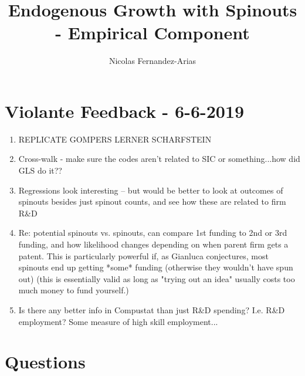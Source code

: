 \documentclass[12pt,english]{article}
\theoremstyle{remark}
\begin{document}
	
	
	
\title{Endogenous Growth with Spinouts - Empirical Component}
\author{Nicolas Fernandez-Arias}
\maketitle

\section*{Violante Feedback - 6-6-2019}

\begin{enumerate}
	\item REPLICATE GOMPERS LERNER SCHARFSTEIN
	\item Cross-walk - make sure the codes aren't related to SIC or something...how did GLS do it??
	\item Regressions look interesting -- but would be better to look at outcomes of spinouts besides just spinout counts, and see how these are related to firm R\&D
	\item Re: potential spinouts vs. spinouts, can compare 1st funding to 2nd or 3rd funding, and how likelihood changes depending on when parent firm gets a patent. This is particularly powerful if, as Gianluca conjectures, most spinouts end up getting *some* funding (otherwise they wouldn't have spun out) (this is essentially valid as long as "trying out an idea" usually costs too much money to fund yourself.)
	\item Is there any better info in Compustat than just R\&D spending? I.e. R\&D employment? Some measure of high skill employment...
\end{enumerate}

\section*{Questions}
\end{document}
